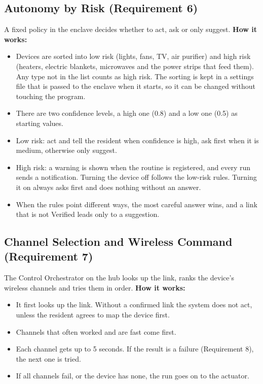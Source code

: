 \documentclass[conference]{IEEEtran}
\begin{document}
\subsection{Autonomy by Risk (Requirement 6)}
A fixed policy in the enclave decides whether to act, ask or only suggest.
\textbf{How it works:}
\begin{itemize}
\item Devices are sorted into low risk (lights, fans, TV, air purifier) and high risk (heaters, electric blankets, microwaves and the power strips that feed them). Any type not in the list counts as high risk. The sorting is kept in a settings file that is passed to the enclave when it starts, so it can be changed without touching the program.
\item There are two confidence levels, a high one (0.8) and a low one (0.5) as starting values.
\item Low risk: act and tell the resident when confidence is high, ask first when it is medium, otherwise only suggest.
\item High risk: a warning is shown when the routine is registered, and every run sends a notification. Turning the device off follows the low-risk rules. Turning it on always asks first and does nothing without an answer.
\item When the rules point different ways, the most careful answer wins, and a link that is not Verified leads only to a suggestion.
\end{itemize}

\subsection{Channel Selection and Wireless Command (Requirement 7)}
The Control Orchestrator on the hub looks up the link, ranks the device's wireless channels and tries them in order.
\textbf{How it works:}
\begin{itemize}
\item It first looks up the link. Without a confirmed link the system does not act, unless the resident agrees to map the device first.
\item Channels that often worked and are fast come first.
\item Each channel gets up to 5 seconds. If the result is a failure (Requirement 8), the next one is tried.
\item If all channels fail, or the device has none, the run goes on to the actuator.
\end{itemize}
\end{document}
